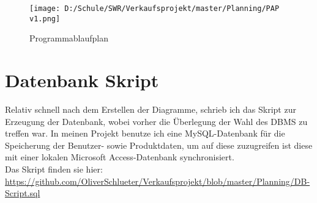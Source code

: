 \begin{figure}[h]
\texttt{[image: D:/Schule/SWR/Verkaufsprojekt/master/Planning/PAP v1.png]}
\caption{Programmablaufplan}
\end{figure}

\newpage
\section{Datenbank Skript}
Relativ schnell nach dem Erstellen der Diagramme, schrieb ich das Skript zur Erzeugung der Datenbank, wobei vorher die Überlegung der Wahl des DBMS zu treffen war. In meinen Projekt benutze ich eine MySQL-Datenbank für die Speicherung der Benutzer- sowie Produktdaten, um auf diese zuzugreifen ist diese mit einer lokalen Microsoft Access-Datenbank synchronisiert.\\
Das Skript finden sie hier: \url{https://github.com/OliverSchlueter/Verkaufsprojekt/blob/master/Planning/DB-Script.sql}